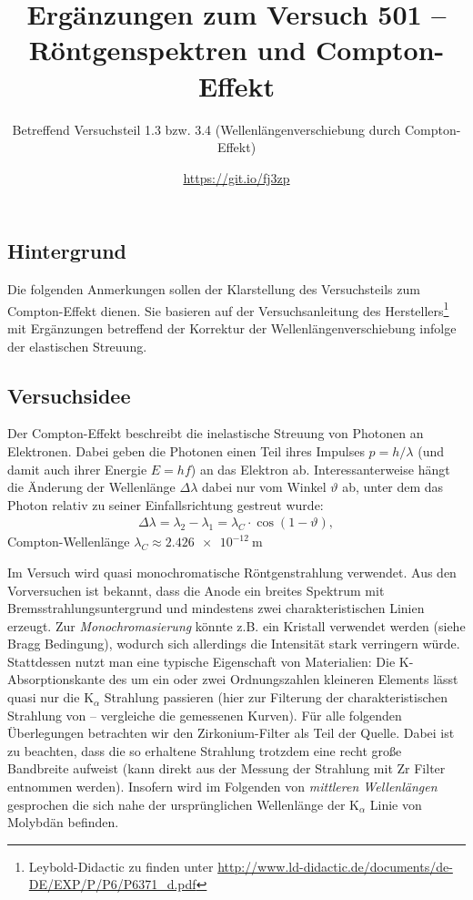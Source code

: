 \documentclass[ngerman,a4paper,twocolumn,twoside]{scrartcl}
\title{Ergänzungen zum Versuch 501 -- Röntgenspektren und Compton-Effekt}
\subtitle{Betreffend Versuchsteil 1.3 bzw. 3.4 (Wellenlängenverschiebung durch Compton-Effekt)}
\author{\url{https://git.io/fj3zp}}
\begin{document}
\maketitle
\subsection*{Hintergrund}
Die folgenden Anmerkungen sollen der Klarstellung des Versuchsteils zum Compton-Effekt dienen. Sie basieren auf der Versuchsanleitung des Herstellers\footnote{Leybold-Didactic zu finden unter \url{http://www.ld-didactic.de/documents/de-DE/EXP/P/P6/P6371_d.pdf}} mit Ergänzungen betreffend der Korrektur der Wellenlängenverschiebung infolge der elastischen Streuung.
\subsection*{Versuchsidee}
Der Compton-Effekt beschreibt die inelastische Streuung von Photonen an Elektronen. Dabei geben die Photonen einen Teil ihres Impulses $p=h/\lambda$ (und damit auch ihrer Energie $E=hf$) an das Elektron ab. Interessanterweise hängt die Änderung der Wellenlänge $\Delta\lambda$ dabei nur vom Winkel $\vartheta$ ab, unter dem das Photon relativ zu seiner Einfallsrichtung gestreut wurde:
\begin{align}
\Delta\lambda=\lambda_2-\lambda_1=\lambda_C \cdot \cos(1-\vartheta), \label{eq:compton}
\end{align}
Compton-Wellenlänge $\lambda_C\approx\SI{2.426e-12}{\m}$
\par
Im Versuch wird quasi monochromatische Röntgenstrahlung verwendet. Aus den Vorversuchen ist bekannt, dass die Anode ein breites Spektrum mit Bremsstrahlungsuntergrund und mindestens zwei charakteristischen Linien erzeugt. Zur \emph{Monochromasierung} könnte z.B. ein Kristall verwendet werden (siehe Bragg Bedingung), wodurch sich allerdings die Intensität stark verringern würde. Stattdessen nutzt man eine typische Eigenschaft von Materialien: Die K-Absorptionskante des um ein oder zwei Ordnungszahlen kleineren Elements lässt quasi nur die $\mathrm{K}_\alpha$ Strahlung passieren (hier  zur Filterung der charakteristischen Strahlung von   -- vergleiche die gemessenen Kurven). Für alle folgenden Überlegungen betrachten wir den Zirkonium-Filter als Teil der Quelle. Dabei ist zu beachten, dass die so erhaltene Strahlung trotzdem eine recht große Bandbreite aufweist (kann direkt aus der Messung der Strahlung mit Zr Filter entnommen werden). Insofern wird im Folgenden von \emph{mittleren Wellenlängen} gesprochen die sich nahe der ursprünglichen Wellenlänge der $\mathrm{K}_\alpha$ Linie von Molybdän befinden.
\end{document}
